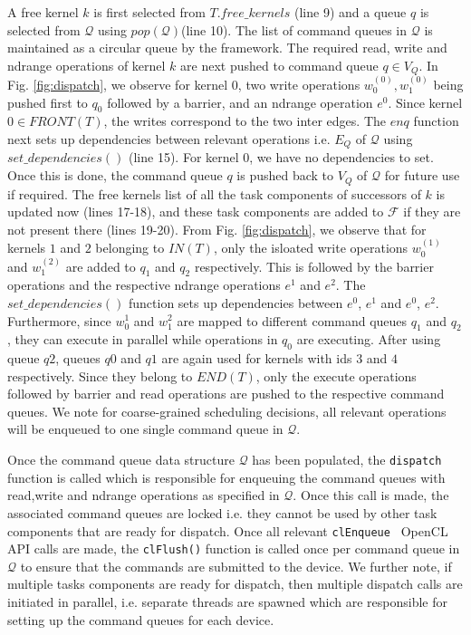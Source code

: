 	 A free kernel $k$ is first selected from $T.free\_kernels$ (line 9) and a queue $q$ is selected from $\mathcal{Q}$ using $pop(\mathcal{Q})$(line 10). The list of command queues in $\mathcal{Q}$ is maintained as a circular queue by the framework. The required read, write and ndrange operations of kernel $k$ are next pushed to command queue $q \in V_Q$. In Fig. \ref{fig:dispatch}, we observe for kernel $0$, two write operations $w_0^{(0)},w_1^{(0)}$ being pushed first to $q_0$ followed by a barrier, and an ndrange operation $e^{0}$. Since kernel $0 \in FRONT(T)$, the writes correspond to the two inter edges. The $enq$ function next sets up dependencies between relevant operations i.e. $E_Q$ of $\mathcal{Q}$ using $set\_dependencies()$ (line 15). For kernel $0$, we have no dependencies to set. Once this is done, the command queue $q$ is pushed back to $V_Q$ of $\mathcal{Q}$ for future use if required. The free kernels list of all the task components of successors of $k$ is updated now (lines 17-18), and these task components are added to $\mathcal{F}$ if they are not present there (lines 19-20). From Fig. \ref{fig:dispatch}, we observe that for kernels $1$ and $2$ belonging to $IN(T)$, only the isloated write operations $w_0^{(1)}$ and  $w_1^{(2)}$ are added to $q_1$ and $q_2$ respectively. This is followed by the barrier operations and the respective ndrange operations $e^{1}$ and $e^{2}$. The $set\_dependencies()$ function sets up dependencies between $e^{0}$, $e^{1}$ and $e^{0}$, $e^{2}$. Furthermore, since $w_0^{1}$ and $w_1^{2}$ are mapped to different command queues $q_1$ and $q_2$, they can execute in parallel while operations in $q_0$ are executing. After using queue $q2$, queues $q0$ and $q1$ are again used   for kernels with ids $3$ and $4$ respectively. Since they belong to $END(T)$, only the execute operations followed by barrier and read operations are pushed to the respective command queues. We note for coarse-grained scheduling decisions,  all relevant operations will be enqueued to one single command queue in $\mathcal{Q}$.
	\par Once the command queue data structure $\mathcal{Q}$ has been populated, the {\tt dispatch} function is called which is responsible for enqueuing the command queues with read,write and ndrange operations as specified in $\mathcal{Q}$. Once this call is made, the associated command queues are locked i.e. they cannot be used by other task components that are ready for dispatch.  Once all relevant {\tt clEnqueue } OpenCL API calls are made, the {\tt clFlush()} function is called once per command queue in $\mathcal{Q}$ to ensure that the commands are submitted to the device. We further note, if multiple tasks components are ready for dispatch, then multiple {dispatch} calls are initiated in parallel, i.e. separate threads are spawned which are responsible for setting up the command queues for each device.
	
